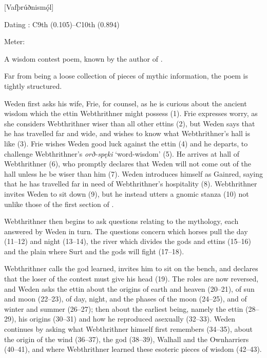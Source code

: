 [Vafþrúðnismǫ́l]

\begin{flushright}%
Dating \parencite{Sapp2022}: C9th (0.105)–C10th (0.894)

Meter: \Ljodahattr%
\end{flushright}%

A wisdom contest poem, known by the author of \Gylfaginning.

Far from being a loose collection of pieces of mythic information, the poem is tightly structured.

Weden first asks his wife, Frie, for counsel, as he is curious about the ancient wisdom which the ettin Webthrithner might possess (1). Frie expresses worry, as she considers Webthrithner wiser than all other ettins (2), but Weden says that he has travelled far and wide, and wishes to know what Webthrithner’s hall is like (3). Frie wishes Weden good luck against the ettin (4) and he departs, to challenge Webthrithner’s \emph{orð-spęki} ‘word-wisdom’ (5). He arrives at hall of Webthrithner (6), who promptly declares that Weden will not come out of the hall unless he be wiser than him (7). Weden introduces himself as Gainred, saying that he has travelled far in need of Webthrithner’s hospitality (8). Webthrithner invites Weden to sit down (9), but he instead utters a gnomic stanza (10) not unlike those of the first section of \Havamal.

Webthrithner then begins to ask questions relating to the mythology, each answered by Weden in turn. The questions concern which horses pull the day (11–12) and night (13–14), the river which divides the gods and ettins (15–16) and the plain where Surt and the gods will fight (17–18).

Webthrithner calls the god learned, invites him to sit on the bench, and declares that the loser of the contest must give his head (19). The roles are now reversed, and Weden asks the ettin about the origins of earth and heaven (20–21), of sun and moon (22–23), of day, night, and the phases of the moon (24–25), and of winter and summer (26–27); then about the earliest being, namely the ettin  (28–29), his origins (30–31) and how he reproduced asexually (32–33). Weden continues by asking what Webthrithner himself first remembers (34–35), about the origin of the wind (36–37), the god  (38–39), Walhall and the Ownharriers (40–41), and where Webthrithner learned these esoteric pieces of wisdom (42–43).

